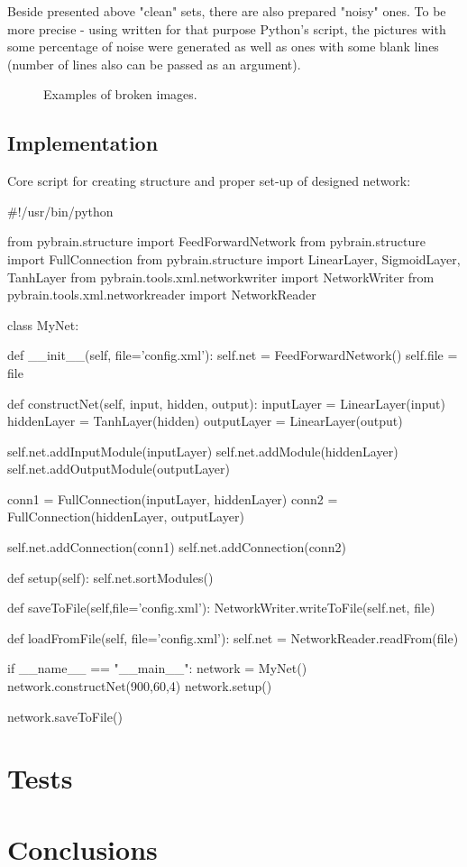 \documentclass[eng,openany]{mgr}
\begin{document}
Beside presented above "clean" sets, there are also prepared "noisy" ones. To be more precise - using written for that purpose Python's  script, the pictures with some percentage of noise were generated as well as ones with some blank lines (number of lines also can be passed as an argument).

\begin{figure}[h]
\centering
\caption{Examples of broken images.}
\label{fig:c}
\end{figure}

\newpage
\section{Implementation}
Core script for creating structure and proper set-up of designed network:
\\
\begin{python}
#!/usr/bin/python

from pybrain.structure import FeedForwardNetwork
from pybrain.structure import FullConnection
from pybrain.structure import LinearLayer, SigmoidLayer, TanhLayer
from pybrain.tools.xml.networkwriter import NetworkWriter
from pybrain.tools.xml.networkreader import NetworkReader

class MyNet:

	def __init__(self, file='config.xml'):
		self.net = FeedForwardNetwork()
		self.file = file

	def constructNet(self, input, hidden, output): 
		inputLayer = LinearLayer(input)
		hiddenLayer = TanhLayer(hidden)
		outputLayer = LinearLayer(output)

		self.net.addInputModule(inputLayer)
		self.net.addModule(hiddenLayer)
		self.net.addOutputModule(outputLayer)

		conn1 = FullConnection(inputLayer, hiddenLayer)
		conn2 = FullConnection(hiddenLayer, outputLayer)

		self.net.addConnection(conn1)
		self.net.addConnection(conn2)

	def setup(self):
		self.net.sortModules()
	
	def saveToFile(self,file='config.xml'):
		NetworkWriter.writeToFile(self.net, file)

	def loadFromFile(self, file='config.xml'):
		self.net = NetworkReader.readFrom(file)

if __name__ == "__main__":
	network = MyNet()
	network.constructNet(900,60,4)
	network.setup()

	network.saveToFile()
\end{python}

\chapter{Tests}
\chapter{Conclusions}
\end{document}
